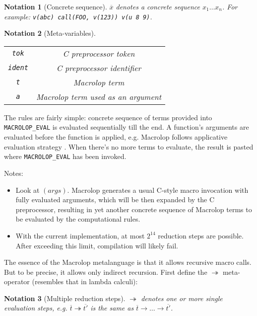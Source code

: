 \documentclass[12pt]{article}
\theoremstyle{break}
\newtheorem{notation}{Notation}
\begin{document}
\begin{notation}[Concrete sequence]
    \label{ConcreteSequenceNotation}
    $\overline{x}$ denotes a concrete sequence $x_1 \ldots x_n$. For example:
    \texttt{v(abc) call(FOO, v(123)) v(u 8 9)}.
\end{notation}

\begin{notation}[Meta-variables]
    \ \\
    \begin{tabular}{|c|c|}
        \hline
        \texttt{tok} & C preprocessor token \\
        \texttt{ident} & C preprocessor identifier \\
        \texttt{t} & Macrolop term \\
        \texttt{a} & Macrolop term used as an argument \\
        \hline
    \end{tabular}
\end{notation}

The rules are fairly simple: concrete sequence of terms provided into \\
\texttt{MACROLOP\_EVAL} is evaluated sequentially till the end. A function's arguments
are evaluated before the function is applied, e.g. Macrolop follows applicative
evaluation strategy \cite{ApplicativeEvaluationStrategy}. When there's no more terms
to evaluate, the result is pasted where \texttt{MACROLOP\_EVAL} has been invoked.

Notes:

\begin{itemize}
    \item Look at $(args)$. Macrolop generates a usual C-style macro invocation with
    fully evaluated arguments, which will be then expanded by the C preprocessor, resulting
    in yet another concrete sequence of Macrolop terms to be evaluated by the computational
    rules.
    \item With the current implementation, at most $2^{14}$ reduction steps are
    possible. After exceeding this limit, compilation will likely fail.
\end{itemize}

The essence of the Macrolop metalanguage is that it allows recursive macro calls. But
to be precise, it allows only indirect recursion. First define the $\twoheadrightarrow$
meta-operator (resembles that in lambda calculi):

\begin{notation}[Multiple reduction steps]
    $\twoheadrightarrow$ denotes one or more single evaluation steps, e.g.
    $\overline{t} \twoheadrightarrow \overline{t'}$ is the same as
    $\overline{t} \to \ldots \to \overline{t'}$.
\end{notation}
\end{document}
